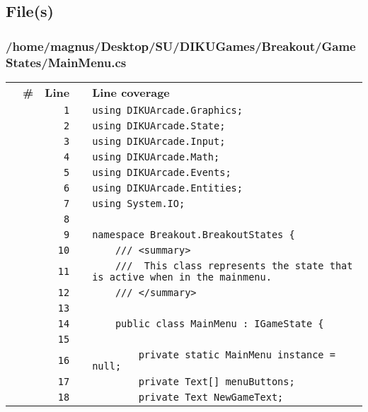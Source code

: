 \documentclass[a4paper,landscape,10pt]{article}
\begin{document}
\subsection{File(s)}
\subsubsection{/home/magnus/Desktop/SU/DIKUGames/Breakout/GameStates/MainMenu.cs}
\begin{longtable}[l]{lrrll}
\textbf{} & \textbf{\#} & \textbf{Line} & \textbf{} & \textbf{Line coverage}\\
\cellcolor{gray} &  & \verb~1~ & & \verb~using DIKUArcade.Graphics;~\\
\cellcolor{gray} &  & \verb~2~ & & \verb~using DIKUArcade.State;~\\
\cellcolor{gray} &  & \verb~3~ & & \verb~using DIKUArcade.Input;~\\
\cellcolor{gray} &  & \verb~4~ & & \verb~using DIKUArcade.Math;~\\
\cellcolor{gray} &  & \verb~5~ & & \verb~using DIKUArcade.Events;~\\
\cellcolor{gray} &  & \verb~6~ & & \verb~using DIKUArcade.Entities;~\\
\cellcolor{gray} &  & \verb~7~ & & \verb~using System.IO;~\\
\cellcolor{gray} &  & \verb~8~ & & \verb~~\\
\cellcolor{gray} &  & \verb~9~ & & \verb~namespace Breakout.BreakoutStates {~\\
\cellcolor{gray} &  & \verb~10~ & & \verb~    /// <summary>~\\
\cellcolor{gray} &  & \verb~11~ & & \verb~    ///  This class represents the state that is active when in the mainmenu.~\\
\cellcolor{gray} &  & \verb~12~ & & \verb~    /// </summary>~\\
\cellcolor{gray} &  & \verb~13~ & & \verb~~\\
\cellcolor{gray} &  & \verb~14~ & & \verb~    public class MainMenu : IGameState {~\\
\cellcolor{gray} &  & \verb~15~ & & \verb~~\\
\cellcolor{gray} &  & \verb~16~ & & \verb~        private static MainMenu instance = null;~\\
\cellcolor{gray} &  & \verb~17~ & & \verb~        private Text[] menuButtons;~\\
\cellcolor{gray} &  & \verb~18~ & & \verb~        private Text NewGameText;~\\

\end{longtable}
\end{document}
